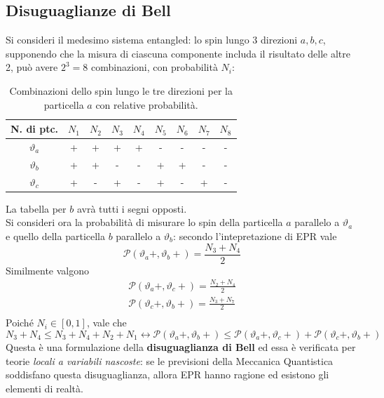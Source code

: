 \subsection{Disuguaglianze di Bell}
Si consideri il medesimo sistema entangled: lo spin lungo 3 direzioni $a,b,c$, supponendo che la misura
di ciascuna componente includa il risultato delle altre 2, può avere $2^3=8$ combinazioni, con 
probabilità $N_i$:
\begin{table}[H]
\centering
\begin{tabular}{|c|cccccccc|}
    \hline
    N. di ptc.&$N_1$&$N_2$&$N_3$&$N_4$&$N_5$&$N_6$&$N_7$&$N_8$\\ \hline
    $\vartheta_a$&+&+&+&+&-&-&-&-\\
    $\vartheta_b$&+&+&-&-&+&+&-&-\\
    $\vartheta_c$&+&-&+&-&+&-&+&-\\ \hline
\end{tabular}
\caption{\small Combinazioni dello spin lungo le tre direzioni per la particella $a$ con relative
probabilità.}
\end{table}
La tabella per $b$ avrà tutti i segni opposti.\\
Si consideri ora la probabilità di misurare lo spin della particella $a$ parallelo a $\vartheta_a$
e quello della particella $b$ parallelo a $\vartheta_b$: secondo l'intepretazione di EPR vale
$$\mathcal{P}(\vartheta_a+,\vartheta_b+)=\frac{N_3+N_4}{2}$$
Similmente valgono
\begin{gather*}
\mathcal{P}(\vartheta_a+,\vartheta_c+)=\frac{N_2+N_4}{2}\\
\mathcal{P}(\vartheta_c+,\vartheta_b+)=\frac{N_3+N_7}{2}\\
\end{gather*}
Poiché $N_i\in[0,1]$, vale che
$$N_3+N_4\leq N_3+N_4+N_2+N_1 \leftrightarrow
\boxed{\mathcal{P}(\vartheta_a+,\vartheta_b+)\leq\mathcal{P}(\vartheta_a+,\vartheta_c+)+
\mathcal{P}(\vartheta_c+,\vartheta_b+)}$$
Questa è una formulazione della \textbf{disuguaglianza di Bell} ed essa è verificata per teorie
\textit{locali a variabili nascoste}: se le previsioni della Meccanica Quantistica soddisfano questa
disuguaglianza, allora EPR hanno ragione ed esistono gli elementi di realtà.

